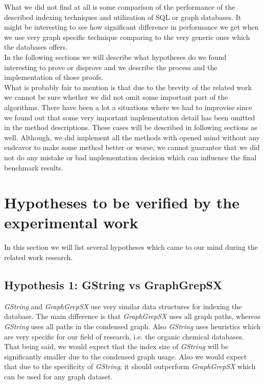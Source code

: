 What we did not find at all is some comparison of the performance of the described indexing techniques and utilization of SQL or graph databases. It might be interesting to see how significant difference in performance we get when we use very graph specific technique comparing to the very generic ones which the databases offers.\\

In the following sections we will describe what hypotheses do we found interesting to prove or disprove and we describe the process and the implementation of those proofs.\\

What is probably fair to mention is that due to the brevity of the related work we cannot be sure whether we did not omit some important part of the algorithms. There have been a lot a situations where we had to improvise since we found out that some very important implementation detail has been omitted in the method descriptions. These cases will be described in following sections as well. Although, we did implement all the methods with opened mind without any endeavor to make some method better or worse, we cannot guarantee that we did not do any mistake or bad implementation decision which can influence the final benchmark results.

\section{Hypotheses to be verified by the experimental work}

In this section we will list several hypotheses which came to our mind during the related work research.

\subsection{Hypothesis 1: GString vs GraphGrepSX}

\textit{GString} and \textit{GraphGrepSX} use very similar data structures for indexing the database. The main difference is that \textit{GraphGrepSX} uses all graph paths, whereas \textit{GString} uses all paths in the condensed graph. Also \textit{GString} uses heuristics which are very specific for our field of research, i.e. the organic chemical databases.\\

That being said, we would expect that the index size of \textit{GString} will be significantly smaller due to the condensed graph usage. Also we would expect that due to the specificity of \textit{GString}, it should outperform \textit{GraphGrepSX} which can be used for any graph dataset.

